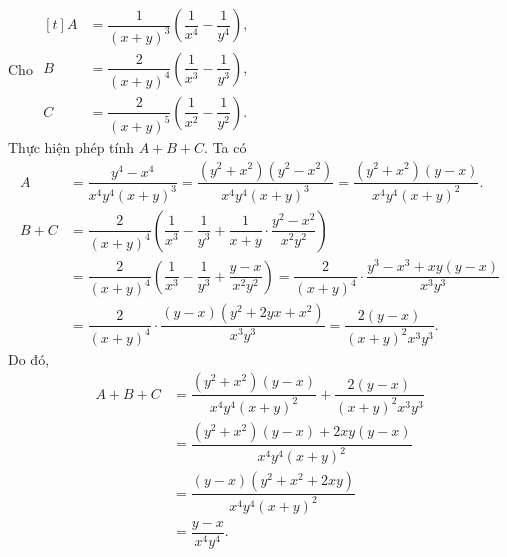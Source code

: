 \begin{vd}%
 Cho $ \begin{aligned}[t]
 A &= \dfrac{1}{(x+y)^3}\left( \dfrac{1}{x^4}-\dfrac{1}{y^4}\right),\\
 B &= \dfrac{2}{(x+y)^4}\left( \dfrac{1}{x^3}-\dfrac{1}{y^3}\right),\\
 C &= \dfrac{2}{(x+y)^5}\left( \dfrac{1}{x^2}-\dfrac{1}{y^2}\right).
\end{aligned}$\\
 Thực hiện phép tính $A+B+C$.
 \loigiai
  {
	Ta có
	$$\begin{array}{ll}
	A & = \dfrac{y^4-x^4}{x^4y^4(x+y)^3}=\dfrac{(y^2+x^2)(y^2-x^2)}{x^4y^4(x+y)^3} = \dfrac{(y^2+x^2)(y-x)}{x^4y^4(x+y)^2}.\\
	B+C& =  \dfrac{2}{(x+y)^4}\left( \dfrac{1}{x^3}-\dfrac{1}{y^3}+\dfrac{1}{x+y}\cdot \dfrac{y^2-x^2}{x^2y^2}\right)\\
	& = \dfrac{2}{(x+y)^4}\left( \dfrac{1}{x^3}-\dfrac{1}{y^3}+ \dfrac{y-x}{x^2y^2}\right) = \dfrac{2}{(x+y)^4}\cdot \dfrac{y^3-x^3+xy(y-x)}{x^3y^3}\\
	& = \dfrac{2}{(x+y)^4}\cdot \dfrac{(y-x)(y^2+2yx+x^2)}{x^3y^3} = \dfrac{2(y-x)}{(x+y)^2x^3y^3}.
	\end{array}$$
	Do đó, 
	$$\begin{array}{ll}
	A+B+C & = \dfrac{(y^2+x^2)(y-x)}{x^4y^4(x+y)^2} + \dfrac{2(y-x)}{(x+y)^2x^3y^3}\\
	& =  \dfrac{(y^2+x^2)(y-x)+2xy(y-x)}{x^4y^4(x+y)^2}\\
	& = \dfrac{(y-x)(y^2+x^2+2xy)}{x^4y^4(x+y)^2}\\
	& = \dfrac{y-x}{x^4y^4}.
	\end{array}$$
	}
\end{vd}


